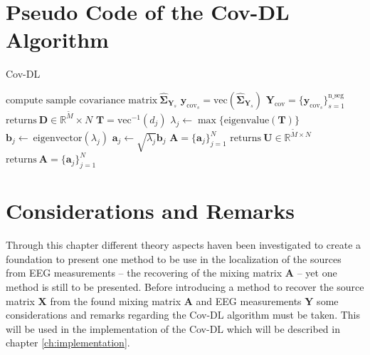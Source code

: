 


\section{Pseudo Code of the Cov-DL Algorithm}\label{seg:alg_cov}
\begin{algorithm}[H]
\caption{Cov-DL}
\begin{algorithmic}[1]
				\State$\text{compute sample covariance matrix}\ \widehat{\boldsymbol{\Sigma}}_{\textbf{Y}_s} $
				\State$\textbf{y}_{\text{cov}_s} = \text{vec}(\widehat{\boldsymbol{\Sigma}}_{\textbf{Y}_s})$	
			\EndFor			
			\State$\textbf{Y}_{\text{cov}} = \{\textbf{y}_{\text{cov}_s}\}_{s=1}^{\text{n\_seg}}$
			\State
			\State$\text{returns} \ \textbf{D} \in \mathbb{R}^{\widetilde{M}}\times N$
			\EndProcedure
			\State$\textbf{T} = \text{vec}^{-1}(d_j)$            
			\State$\lambda_j\gets \max\{\text{eigenvalue}(\textbf{T})\}$
			\State$\textbf{b}_j \gets \ \text{eigenvector}(\lambda_j)$
			\State$\textbf{a}_j \gets \sqrt{\lambda_j}\textbf{b}_j$
			\EndFor
			\State$\textbf{A} = \{\textbf{a}_j\}_{j=1}^N$
			\EndIf
			\State
				\State$\text{returns} \ \textbf{U}\in \mathbb{R}^{\widetilde{M}\times N}$
				\EndProcedure
				\State$\text{returns}\ \textbf{A}= \{\textbf{a}_j\}_{j=1}^{N}$
				\EndProcedure
			\EndIf
           \EndProcedure
        \end{algorithmic} 
        \label{alg:Cov1}
\end{algorithm}

\section{Considerations and Remarks}
Through this chapter different theory aspects haven been investigated to create a foundation to present one method to be use in the localization of the sources from EEG measurements -- the recovering of the mixing matrix $\mathbf{A}$ -- yet one method is still to be presented.
Before introducing a method to recover the source matrix $\mathbf{X}$ from the found mixing matrix $\mathbf{A}$ and EEG measurements $\mathbf{Y}$ some considerations and remarks regarding the Cov-DL algorithm must be taken. 
This will be used in the implementation of the Cov-DL which will be described in chapter \ref{ch:implementation}.

